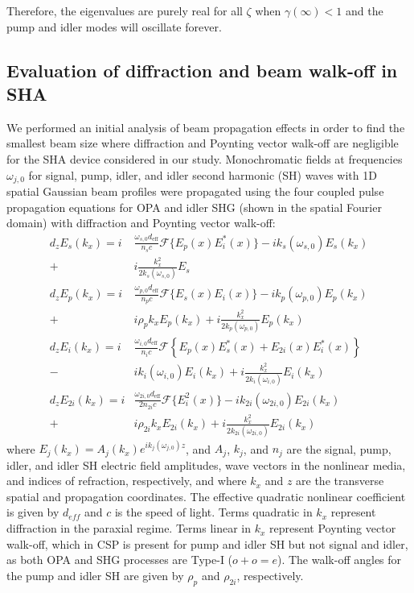 \documentclass[%
 reprint,
 amsmath,amssymb,
 aps,
floatfix,
]{revtex4-2}
\begin{document}
\noindent Therefore, the eigenvalues are purely real for all $\zeta$ when $\gamma(\infty)<1$ and the pump and idler modes will oscillate forever.

\subsection{Evaluation of diffraction and beam walk-off in SHA}

We performed an initial analysis of beam propagation effects in order to find the smallest beam size where diffraction and Poynting vector walk-off are negligible for the SHA device considered in our study. Monochromatic fields at frequencies $\omega_{j,0}$ for signal, pump, idler, and idler second harmonic (SH) waves with 1D spatial Gaussian beam profiles were propagated using the four coupled pulse propagation equations for OPA and idler SHG (shown in the spatial Fourier domain) with diffraction and Poynting vector walk-off:
\begin{align}
    d_{z}E_s(k_x) = i& \frac{\omega_{s,0} d_{\text{eff}}}{n_s c} \mathcal{F} \{E_p(x) E_i^*(x)\} - i k_s(\omega_{s,0})E_s(k_x) \nonumber \\
    +& i \frac{k_x^2}{2k_s(\omega_{s,0})} E_s \label{eq:space-s} \\
    d_{z}E_p(k_x) = i& \frac{\omega_{p,0} d_{\text{eff}}}{n_p c} \mathcal{F} \{E_s(x) E_i(x)\} - i k_p(\omega_{p,0})E_p(k_x) \nonumber \\
    +& i \rho_{p} k_x E_{p}(k_x) + i \frac{k_x^2}{2k_p(\omega_{p,0})} E_p(k_x) \label{eq:space-p} \\
    d_{z}E_i(k_x) = i& \frac{\omega_{i,0} d_{\text{eff}}}{n_i c}\mathcal{F} \left\{E_p(x) E_s^*(x) + E_{2i}(x) E_i^*(x)\right\} \nonumber \\ 
    -& i k_i(\omega_{i,0})E_i(k_x) + i \frac{k_x^2}{2k_i(\omega_{i,0})} E_i(k_x) \label{eq:space-i} \\
    d_{z}E_{2i}(k_x) = i& \frac{\omega_{2i,0} d_{\text{eff}}}{2n_{2i} c} \mathcal{F} \{E_i^2(x)\} - i k_{2i}(\omega_{2i,0})E_{2i}(k_x) \nonumber \\
    +& i \rho_{2i} k_x E_{2i}(k_x) + i \frac{k_x^2}{2k_{2i}(\omega_{2i,0})} E_{2i}(k_x) \label{eq:space-2i}
\end{align}
\noindent where  $E_j(k_x)=A_j (k_x)e^{i k_j(\omega_{j,0})z}$, and $A_j$, $k_j$, and $n_j$ are the signal, pump, idler, and idler SH electric field amplitudes, wave vectors in the nonlinear media, and indices of refraction, respectively, and where $k_x$ and $z$ are the transverse spatial and propagation coordinates. The effective quadratic nonlinear coefficient is given by $d_{eff}$ and $c$ is the speed of light. Terms quadratic in $k_x$ represent diffraction in the paraxial regime. Terms linear in $k_x$ represent Poynting vector walk-off, which in CSP is present for pump and idler SH but not signal and idler, as both OPA and SHG processes are Type-I ($o + o = e$). The walk-off angles for the pump and idler SH are given by $\rho_p$ and $\rho_{2i}$, respectively.
\end{document}
